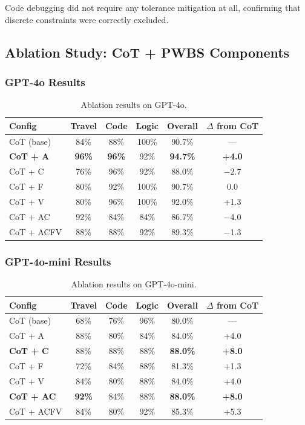 \documentclass[11pt,a4paper]{article}
\begin{document}
Code debugging did not require any tolerance mitigation at all, confirming that discrete constraints were correctly excluded.

\subsection{Ablation Study: CoT + PWBS Components}

\subsubsection{GPT-4o Results}

\begin{table}[h]
\centering
\caption{Ablation results on GPT-4o.}
\label{tab:ablation-4o}
\begin{tabular}{lccccc}
\toprule
\textbf{Config} & \textbf{Travel} & \textbf{Code} & \textbf{Logic} & \textbf{Overall} & \textbf{$\Delta$ from CoT} \\
\midrule
CoT (base) & 84\% & 88\% & 100\% & 90.7\% & --- \\
\textbf{CoT + A} & \textbf{96\%} & \textbf{96\%} & 92\% & \textbf{94.7\%} & \textbf{+4.0} \\
CoT + C & 76\% & 96\% & 92\% & 88.0\% & $-$2.7 \\
CoT + F & 80\% & 92\% & 100\% & 90.7\% & 0.0 \\
CoT + V & 80\% & 96\% & 100\% & 92.0\% & +1.3 \\
CoT + AC & 92\% & 84\% & 84\% & 86.7\% & $-$4.0 \\
CoT + ACFV & 88\% & 88\% & 92\% & 89.3\% & $-$1.3 \\
\bottomrule
\end{tabular}
\end{table}

\subsubsection{GPT-4o-mini Results}

\begin{table}[h]
\centering
\caption{Ablation results on GPT-4o-mini.}
\label{tab:ablation-mini}
\begin{tabular}{lccccc}
\toprule
\textbf{Config} & \textbf{Travel} & \textbf{Code} & \textbf{Logic} & \textbf{Overall} & \textbf{$\Delta$ from CoT} \\
\midrule
CoT (base) & 68\% & 76\% & 96\% & 80.0\% & --- \\
CoT + A & 88\% & 80\% & 84\% & 84.0\% & +4.0 \\
\textbf{CoT + C} & 88\% & 88\% & 88\% & \textbf{88.0\%} & \textbf{+8.0} \\
CoT + F & 72\% & 84\% & 88\% & 81.3\% & +1.3 \\
CoT + V & 84\% & 80\% & 88\% & 84.0\% & +4.0 \\
\textbf{CoT + AC} & \textbf{92\%} & 84\% & 88\% & \textbf{88.0\%} & \textbf{+8.0} \\
CoT + ACFV & 84\% & 80\% & 92\% & 85.3\% & +5.3 \\
\bottomrule
\end{tabular}
\end{table}
\end{document}
